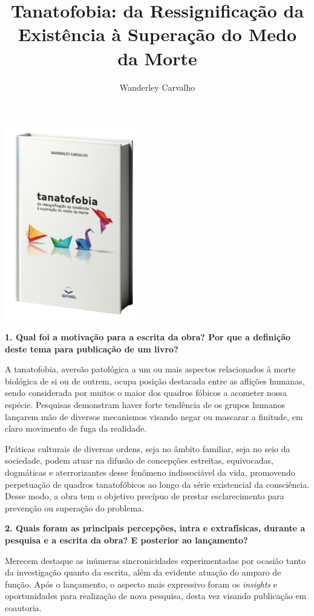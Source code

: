 \documentclass{gescons}
\author{Wanderley Carvalho}
\title{Tanatofobia: da Ressignificação da Existência à Superação do Medo da Morte}
\begin{document}
    \makeentrevistatitle

    \begin{multicols}{2}

\begin{center}
    \vspace{-0.5cm}
    \includegraphics[width=6cm]{articles/entrevista/mockups/Wanderley_Carvalho.png}
\end{center}


\textbf{1. Qual foi a motivação para a escrita da obra? Por que a definição deste tema para publicação de um livro?}


A tanatofobia, aversão patológica a um ou mais aspectos relacionados à
morte biológica de si ou de outrem, ocupa posição destacada entre as
aflições humanas, sendo considerada por muitos o maior dos quadros
fóbicos a acometer nossa espécie. Pesquisas demonstram haver forte
tendência de os grupos humanos lançarem mão de diversos mecanismos
visando negar ou mascarar a finitude, em claro movimento de fuga da
realidade.

Práticas culturais de diversas ordens, seja no âmbito familiar, seja no
seio da sociedade, podem atuar na difusão de concepções estreitas,
equivocadas, dogmáticas e aterrorizantes desse fenômeno indissociável da
vida, promovendo perpetuação de quadros tanatofóbicos ao longo da série
existencial da consciência. Desse modo, a obra tem o objetivo precípuo
de prestar esclarecimento para prevenção ou superação do problema.

\textbf{2. Quais foram as principais percepções, intra e extrafísicas, durante a pesquisa e a escrita da obra? E posterior ao lançamento?}

Merecem destaque as inúmeras sincronicidades experimentadas por ocasião
tanto da investigação quanto da escrita, além da evidente atuação do
amparo de função. Após o lançamento, o aspecto mais expressivo foram os
\emph{insights} e oportunidades para realização de nova pesquisa, desta
vez visando publicação em coautoria.


\end{multicols}
\end{document}
